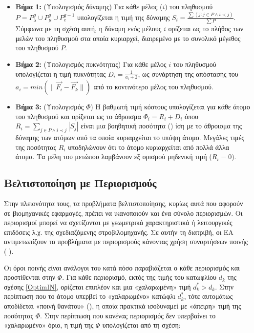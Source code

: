 \begin{itemize}
\item[]{\bf Βήμα 1:}  (Υπολογισμός δύναμης) Για κάθε μέλος ($i$) του πληθυσμού 
\newline
	$P=P_{\lambda}^g \cup P_{\mu}^g \cup P_{e}^{g-1}$
	υπολογίζεται η τιμή της δύναμης
		$S_i = \frac{\sum(j : j \in P \wedge i \prec j)} {\sum P}$. Σύμφωνα με τη σχέση αυτή, η δύναμη ενός μέλους $i$ ορίζεται ως το πλήθος των μελών του πληθυσμού στα οποία κυριαρχεί, διαιρεμένο με το συνολικό μέγεθος του πληθυσμού $P$.     

\item[]{\bf Βήμα 2:}  (Υπολογισμός πυκνότητας) Για κάθε μέλος $i$
	του πληθυσμού υπολογίζεται η τιμή πυκνότητας $D_i = \frac{1} {a_i+2}$, ως συνάρτηση της απόστασής του $a_i= min (\parallel \vec{F_i} - \vec{F_k} \parallel)$ από το κοντινότερο μέλος του πληθυσμού. 
	
\item[]{\bf Βήμα 3:}  (Υπολογισμός $\Phi$) 
Η βαθμωτή τιμή κόστους υπολογίζεται για κάθε άτομο του πληθυσμού και ορίζεται ως το άθροισμα
	$\Phi_i = R_i+D_i$
όπου 
\newline
$R_i=\sum _{j \in P \wedge i \prec j}|S_j|$ είναι μια βοηθητική ποσότητα () 
ίση με το άθροισμα της δύναμης των ατόμων από τα οποία κυριαρχείται το υπόψη άτομο. Μεγάλες τιμές της ποσότητας $R_i$ υποδηλώνουν ότι το άτομο κυριαρχείται από πολλά άλλα άτομα. Τα μέλη του μετώπου  λαμβάνουν εξ ορισμού μηδενική τιμή ($R_i=0$).
\end{itemize}


\subsection{Βελτιστοποίηση με Περιορισμούς}
\label{COPini}
Στην πλειονότητα τους, τα προβλήματα βελτιστοποίησης, κυρίως αυτά που αφορούν σε βιομηχανικές εφαρμογές, πρέπει να ικανοποιούν και ένα σύνολο περιορισμών. Οι περιορισμοί μπορεί να σχετίζονται με γεωμετρικά χαρακτηριστικά ή λειτουργικές επιδόσεις λ.χ. της σχεδιαζόμενης στροβιλομηχανής.  Σε αυτήν τη διατριβή, οι 
ΕΑ 
\newline
αντιμετωπίζουν τα προβλήματα με περιορισμούς κάνοντας χρήση συναρτήσεων ποινής ( \cite{Deb00,morales98}).   

Οι όροι ποινής είναι ανάλογοι του κατά πόσο παραβιάζεται ο κάθε περιορισμός και προστίθενται στην $\Phi$. Για κάθε περιορισμό, εκτός της τιμής του κατωφλίου $d_k$ της σχέσης \ref{OptimIN}, ορίζεται επιπλέον και μια «χαλαρωμένη» τιμή $d_k^*\!>\!d_k$. Στην περίπτωση που το άτομο υπερβεί το «χαλαρωμένο» κατώφλι $d_k^*$, τότε αυτομάτως αποδίδεται «ποινή θανάτου» (), η οποία πρακτικά ισοδυναμεί με «άπειρη» τιμή της ποσότητας $\Phi$. Στην περίπτωση που κανένας περιορισμός δεν υπερβαίνει το «χαλαρωμένο» όριο, η τιμή της $\Phi$ υπολογίζεται από τη σχέση:
     
